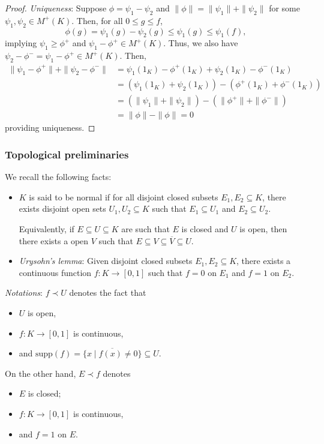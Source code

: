 \documentclass[]{article}
\theoremstyle{definition}
\begin{document}
\begin{proof}
  \textit{Uniqueness}: Suppose \(\phi = \psi_1 - \psi_2\) and \(\|\phi\| = \|\psi_1\| + \|\psi_2\|\) 
  for some \(\psi_1, \psi_2 \in M^+(K)\). Then, for all \(0 \le g \le f\), 
  \[\phi(g) = \psi_1(g) - \psi_2(g) \le \psi_1(g) \le \psi_1(f),\]
  implying \(\psi_1 \ge \phi^+\) and \(\psi_1 - \phi^+ \in M^+(K)\). Thus, we also have
  \(\psi_2 - \phi^- = \psi_1 - \phi^+ \in M^+(K)\). Then, 
  \begin{align*}
    \|\psi_1 - \phi^+\| + \|\psi_2 - \phi^-\| &= \psi_1(1_K) - \phi^+(1_K) + \psi_2(1_K) - \phi^-(1_K)\\
    & = (\psi_1(1_K) + \psi_2(1_K)) - (\phi^+(1_K) + \phi^-(1_K))\\
    & = (\|\psi_1\| + \|\psi_2\|) - (\|\phi^+\| + \|\phi^-\|)\\
    & = \|\phi\| - \|\phi\| = 0
  \end{align*} 
  providing uniqueness.
\end{proof}

\subsubsection{Topological preliminaries}

We recall the following facts:
\begin{itemize}
  \item \(K\) is said to be normal if for all disjoint closed subsets \(E_1, E_2 \subseteq K\), 
    there exists disjoint open sets \(U_1, U_2 \subseteq K\) such that \(E_1 \subseteq U_1\) and
    \(E_2 \subseteq U_2\).

    Equivalently, if \(E \subseteq U \subseteq K\) are such that \(E\) is closed and \(U\) is open, 
    then there exists a open \(V\) such that \(E \subseteq V \subseteq \overline{V} \subseteq U\).
  \item \textit{Urysohn's lemma}: Given disjoint closed subsets \(E_1, E_2 \subseteq K\), there exists 
    a continuous function \(f : K \to [0, 1]\) such that \(f = 0\) on \(E_1\) and \(f = 1\) on \(E_2\).

\end{itemize}
  
\textit{Notations}: \(f \prec U\) denotes the fact that 
\begin{itemize}
  \item \(U\) is open,
  \item \(f : K \to [0, 1]\) is continuous,
  \item and \(\text{supp}(f) = \overline{\{x \mid f(x) \neq 0\}} \subseteq U\).
\end{itemize}
On the other hand, \(E \prec f\) denotes
\begin{itemize}
  \item \(E\) is closed;
  \item \(f : K \to [0, 1]\) is continuous,
  \item and \(f = 1\) on \(E\).
\end{itemize}
\end{document}
